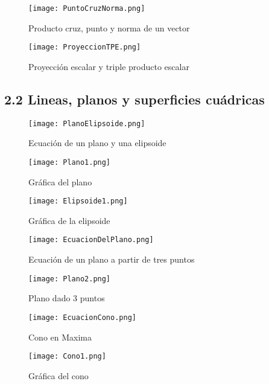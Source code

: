 \documentclass[a4 paper]{article}
\numberwithin{equation}{section}
\newcommand{\0}{\mathbf{0}}
\begin{document}
\begin{figure}[!ht]
  \centering
      \texttt{[image: PuntoCruzNorma.png]}
  \caption{Producto cruz, punto y norma de un vector}
\end{figure}
\newpage

\begin{figure}[!ht]
  \centering
      \texttt{[image: ProyeccionTPE.png]}
  \caption{Proyecci\'on escalar y triple producto escalar}
\end{figure}


\subsection*{2.2 Lineas, planos y superficies cu\'adricas}

\begin{figure}[!ht]
  \centering
      \texttt{[image: PlanoElipsoide.png]}
  \caption{Ecuaci\'on de un plano y una elipsoide}
\end{figure}

\begin{figure}[!ht]
  \centering
      \texttt{[image: Plano1.png]}
  \caption{Gr\'afica del plano}
\end{figure}

\begin{figure}[!ht]
  \centering
      \texttt{[image: Elipsoide1.png]}
  \caption{Gr\'afica de la elipsoide}
\end{figure}
\newpage
\begin{figure}[!ht]
  \centering
      \texttt{[image: EcuacionDelPlano.png]}
  \caption{Ecuaci\'on de un plano a partir de tres puntos}
\end{figure}

\begin{figure}[!ht]
  \centering
      \texttt{[image: Plano2.png]}
  \caption{Plano dado 3 puntos}
\end{figure}

\begin{figure}[!ht]
  \centering
      \texttt{[image: EcuacionCono.png]}
  \caption{Cono en Maxima}
\end{figure}

\begin{figure}[!ht]
  \centering
      \texttt{[image: Cono1.png]}
  \caption{Gr\'afica del cono}
\end{figure}
\end{document}
